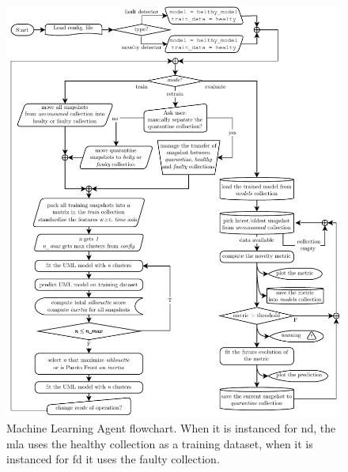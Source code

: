 \begin{figure}[htbp]
    \centering
    \includegraphics[width=\textwidth]{images/Framework/MLA.pdf}
    \caption{Machine Learning Agent flowchart. When it is instanced for \gls{nd}, the \gls{mla} uses the healthy collection as a training dataset, when it is instanced for \gls{fd} it uses the faulty collection.}
    \label{fig:MLA_structure}
\end{figure}


